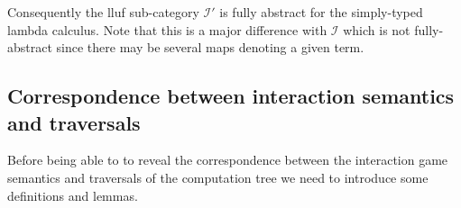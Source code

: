 Consequently the lluf sub-category $\mathcal{I'}$ is fully abstract for the simply-typed lambda calculus.
Note that this is a major difference with $\mathcal{I}$ which is not fully-abstract since there may be several maps denoting a given
term.




\subsection{Correspondence between interaction semantics and traversals}

Before being able to to reveal the correspondence between the
interaction game semantics and traversals of the computation tree we
need to introduce some definitions and lemmas.

%

